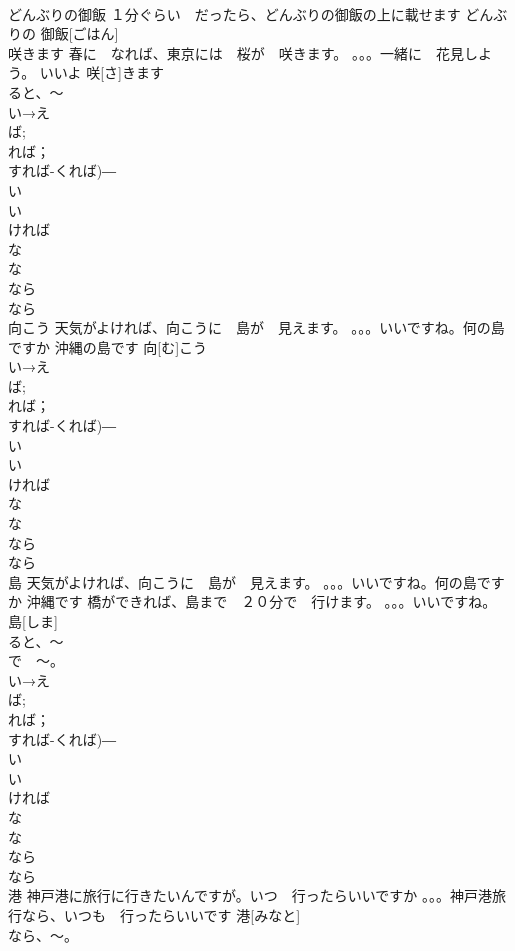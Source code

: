 \documentclass[8pt]{extreport}
\begin{document}
\begin{CJK}{UTF8}{min}
\\	どんぶりの御飯	１分ぐらい　だったら、どんぶりの御飯の上に載せます	どんぶりの 御飯[ごはん]			
\\	咲きます	春に　なれば、東京には　桜が　咲きます。 。。。一緒に　花見しよう。 いいよ	咲[さ]きます			
\\	ると、～	
\\	い→え
\\	ば;
\\	れば；
\\	すれば-くれば)―　
\\	い
\\	い　
\\	ければ　
\\	な 
\\	な
\\	なら　
\\	なら
\\	向こう	天気がよければ、向こうに　島が　見えます。 。。。いいですね。何の島ですか 沖縄の島です	向[む]こう			
\\	い→え
\\	ば;
\\	れば；
\\	すれば-くれば)―　
\\	い
\\	い　
\\	ければ　
\\	な 
\\	な
\\	なら　
\\	なら
\\	島	天気がよければ、向こうに　島が　見えます。 。。。いいですね。何の島ですか 沖縄です 橋ができれば、島まで　２０分で　行けます。 。。。いいですね。	島[しま]			
\\	ると、～ 
\\	で　～。
\\	い→え
\\	ば;
\\	れば；
\\	すれば-くれば)―　
\\	い
\\	い　
\\	ければ　
\\	な 
\\	な
\\	なら　
\\	なら
\\	港	神戸港に旅行に行きたいんですが。いつ　行ったらいいですか 。。。神戸港旅行なら、いつも　行ったらいいです	港[みなと]			
\\	なら、～。

\end{CJK}
\end{document}
